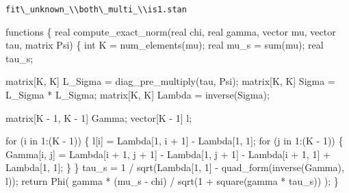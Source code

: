\documentclass[
  letterpaper,
  DIV=11,
  numbers=noendperiod]{scrartcl}
\newenvironment{Shaded}{\begin{snugshade}}{\end{snugshade}}
\newcommand{\ControlFlowTok}[1]{\textcolor[rgb]{0.00,0.23,0.31}{#1}}
\newcommand{\DataTypeTok}[1]{\textcolor[rgb]{0.68,0.00,0.00}{#1}}
\newcommand{\DecValTok}[1]{\textcolor[rgb]{0.68,0.00,0.00}{#1}}
\newcommand{\KeywordTok}[1]{\textcolor[rgb]{0.00,0.23,0.31}{#1}}
\newcommand{\NormalTok}[1]{\textcolor[rgb]{0.00,0.23,0.31}{#1}}
\begin{document}
\begin{codelisting}

\caption{\texttt{fit\textbackslash\_unknown\_\textbackslash\textbackslash both\textbackslash\_multi\_\textbackslash\textbackslash is1.stan}}

\begin{Shaded}
\begin{Highlighting}[]
\KeywordTok{functions}\NormalTok{ \{}
  \DataTypeTok{real}\NormalTok{ compute\_exact\_norm(}\DataTypeTok{real}\NormalTok{ chi, }\DataTypeTok{real}\NormalTok{ gamma,}
                          \DataTypeTok{vector}\NormalTok{ mu, }\DataTypeTok{vector}\NormalTok{ tau, }\DataTypeTok{matrix}\NormalTok{ Psi) \{}
    \DataTypeTok{int}\NormalTok{ K = num\_elements(mu);}
    \DataTypeTok{real}\NormalTok{ mu\_s = sum(mu);}
    \DataTypeTok{real}\NormalTok{ tau\_s;}

    \DataTypeTok{matrix}\NormalTok{[K, K] L\_Sigma = diag\_pre\_multiply(tau, Psi);}
    \DataTypeTok{matrix}\NormalTok{[K, K] Sigma = L\_Sigma * L\_Sigma\textquotesingle{};}
    \DataTypeTok{matrix}\NormalTok{[K, K] Lambda = inverse(Sigma);}

    \DataTypeTok{matrix}\NormalTok{[K {-} }\DecValTok{1}\NormalTok{, K {-} }\DecValTok{1}\NormalTok{] Gamma;}
    \DataTypeTok{vector}\NormalTok{[K {-} }\DecValTok{1}\NormalTok{] l;}

    \ControlFlowTok{for}\NormalTok{ (i }\ControlFlowTok{in} \DecValTok{1}\NormalTok{:(K {-} }\DecValTok{1}\NormalTok{)) \{}
\NormalTok{      l[i] = Lambda[}\DecValTok{1}\NormalTok{, i + }\DecValTok{1}\NormalTok{] {-} Lambda[}\DecValTok{1}\NormalTok{, }\DecValTok{1}\NormalTok{];}
      \ControlFlowTok{for}\NormalTok{ (j }\ControlFlowTok{in} \DecValTok{1}\NormalTok{:(K {-} }\DecValTok{1}\NormalTok{)) \{}
\NormalTok{        Gamma[i, j] =  Lambda[i + }\DecValTok{1}\NormalTok{, j + }\DecValTok{1}\NormalTok{]}
\NormalTok{                     {-} Lambda[}\DecValTok{1}\NormalTok{, j + }\DecValTok{1}\NormalTok{] {-} Lambda[i + }\DecValTok{1}\NormalTok{, }\DecValTok{1}\NormalTok{]}
\NormalTok{                     + Lambda[}\DecValTok{1}\NormalTok{, }\DecValTok{1}\NormalTok{];}
\NormalTok{      \}}
\NormalTok{    \}}
\NormalTok{    tau\_s = }\DecValTok{1}\NormalTok{ / sqrt(Lambda[}\DecValTok{1}\NormalTok{, }\DecValTok{1}\NormalTok{] {-} quad\_form(inverse(Gamma), l));}
    \ControlFlowTok{return}\NormalTok{ Phi(  gamma * (mu\_s {-} chi)}
\NormalTok{               / sqrt(}\DecValTok{1}\NormalTok{ + square(gamma * tau\_s)) );}
\NormalTok{  \}}


\end{Highlighting}
\end{Shaded}
\end{codelisting}
\end{document}
